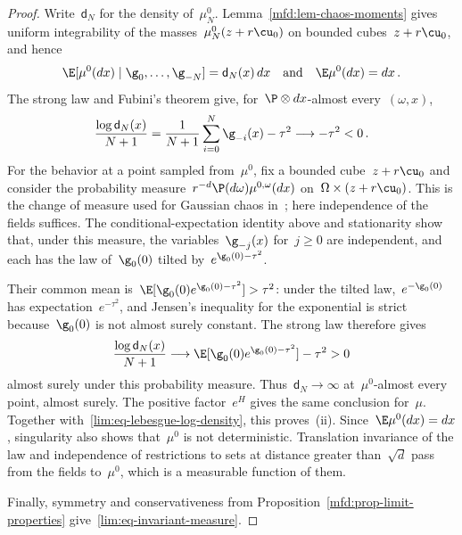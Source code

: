 \documentclass[11pt]{amsart}
\begin{document}
\begin{proof}
Write~$\mathsf d_N$ for the density of~$\mu_N^0$. Lemma~\ref{mfd:lem-chaos-moments} gives uniform integrability of the masses~$\mu_N^0(z+r\cu_0)$ on bounded cubes~$z+r\cu_0$, and hence
\begin{equation*}
	\E[\mu^0(dx)\mid\g_0,\ldots,\g_{-N}]=\mathsf d_N(x)\,dx\quad\text{and}\quad
	\E\mu^0(dx)=dx\,.
\end{equation*}
The strong law and Fubini's theorem give, for~$\P\otimes dx$-almost every~$(\omega,x)$,
\begin{equation}
	\frac{\log\mathsf d_N(x)}{N+1}
	=\frac1{N+1}\sum_{i=0}^N\g_{-i}(x)-\tau^2
	\longrightarrow-\tau^2<0\,.
	\label{lim:eq-lebesgue-log-density}
\end{equation}
For the behavior at a point sampled from~$\mu^0$, fix a bounded cube~$z+r\cu_0$ and consider the probability measure~$r^{-d}\P(d\omega)\mu^{0,\omega}(dx)$ on~$\Omega\times(z+r\cu_0)$. This is the change of measure used for Gaussian chaos in~\citet[Section~4.1]{RVsurvey}; here independence of the fields suffices. The conditional-expectation identity above and stationarity show that, under this measure, the variables~$\g_{-j}(x)$ for~$j\geq0$ are independent, and each has the law of~$\g_0(0)$ tilted by~$e^{\g_0(0)-\tau^2}$.

\smallskip

Their common mean is~$\E[\g_0(0)e^{\g_0(0)-\tau^2}]>\tau^2$: under the tilted law,~$e^{-\g_0(0)}$ has expectation~$e^{-\tau^2}$, and Jensen's inequality for the exponential is strict because~$\g_0(0)$ is not almost surely constant. The strong law therefore gives
\begin{equation*}
	\frac{\log\mathsf d_N(x)}{N+1}
	\longrightarrow\E[\g_0(0)e^{\g_0(0)-\tau^2}]-\tau^2>0
\end{equation*}
almost surely under this probability measure. Thus~$\mathsf d_N\to\infty$ at~$\mu^0$-almost every point, almost surely. The positive factor~$e^H$ gives the same conclusion for~$\mu$. Together with~\eqref{lim:eq-lebesgue-log-density}, this proves~(ii). Since~$\E\mu^0(dx)=dx$, singularity also shows that~$\mu^0$ is not deterministic. Translation invariance of the law and independence of restrictions to sets at distance greater than~$\sqrt d$ pass from the fields to~$\mu^0$, which is a measurable function of them.

\smallskip

Finally, symmetry and conservativeness from Proposition~\ref{mfd:prop-limit-properties} give~\eqref{lim:eq-invariant-measure}.
\end{proof}
\end{document}
